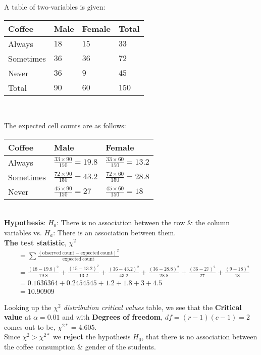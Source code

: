 \documentclass[boxes, qed]{homework}
\begin{document}
\begin{problem}
  A table of two-variables is given:\\
 
  \begin{tabular}{l|l|l|l}
    \hline
    Coffee & Male & Female & Total \\
    \hline
    Always &    $18$ & $15$ & $33$ \\
    Sometimes & $36$ & $36$ & $72$ \\
    Never &     $36$ & $9$ &  $45$ \\
    \hline
    Total &     $90$ & $60$ & $150$ \\
    \hline
  \end{tabular}\\
\end{problem}

\begin{solution}
  The expected cell counts are as follows:\\

  \begin{tabular}{l|l|l}
    \hline
    Coffee & Male & Female \\
    \hline
    Always &    $\frac{33\times 90}{150}=19.8$ & $\frac{33\times 60}{150}=13.2$ \\
    Sometimes & $\frac{72\times 90}{150}=43.2$ & $\frac{72\times 60}{150}=28.8$ \\
    Never &     $\frac{45\times 90}{150}=27$ & $\frac{45\times 60}{150}=18$ \\
    \hline
  \end{tabular}\\

  \textbf{Hypothesis}: $H_0$: There is no association between the row \& the column variables vs.
  $H_a$: There is an association between them. \\

  \textbf{The test statistic}, $\chi^2$
  \begin{align*}
    &=\sum{\frac{(\mathrm{observed\ count}-\mathrm{expected\ count})^2}{\mathrm{expected\ count}}}\\
    &=\frac{(18-19.8)^2}{19.8} 
    +\frac{(15-13.2)^2}{13.2} 
    +\frac{(36-43.2)^2}{43.2} 
    +\frac{(36-28.8)^2}{28.8}
    +\frac{(36-27)^2}{27}
    +\frac{(9-18)^2}{18}\\
    &=0.1636364+0.2454545+1.2+1.8+3+4.5\\
    &=10.90909
  \end{align*}

  Looking up the \textit{$\chi^2$ distribution critical values} table, we see that
  the \textbf{Critical value} at $\alpha=0.01$ and
  with \textbf{Degrees of freedom}, $df=(r-1)(c-1)=2$ comes out to be,
  $\chi^{2*}=4.605$.\\

  Since $\chi^2>\chi^{2*}$ we \textbf{reject} the hypothesis $H_0$, that there 
  is no association between the coffee consumption \& gender of the students.
\end{solution}
\end{document}
